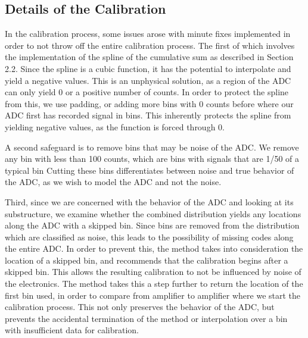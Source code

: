 \documentclass[11pt, letterpaper]{article}
\begin{document}
\subsection{Details of the Calibration} 
\indent 


In the calibration process, some issues arose with minute fixes implemented in order to not throw off the entire calibration process. 
The first of which involves the implementation of the spline of the cumulative sum as described in Section 2.2. 
Since the spline is a cubic function, it has the potential to interpolate and yield a negative values. 
This is an unphysical solution, as a region of the ADC can only yield 0 or a positive number of counts. 
In order to protect the spline from this, we use padding, or adding more bins with 0 counts before where our ADC first has recorded signal in bins. 
This inherently protects the spline from yielding negative values, as the function is forced through 0. 
\indent 


A second safeguard is to remove bins that may be noise of the ADC. 
We remove any bin with less than 100 counts, which are bins with signals that are 1/50 of a typical bin
Cutting these bins differentiates between noise and true behavior of the ADC, as we wish to model the ADC and not the noise. 
\indent


Third, since we are concerned with the behavior of the ADC and looking at its substructure, we examine whether the combined distribution yields any locations along the ADC with a skipped bin. 
Since bins are removed from the distribution which are classified as noise, this leads to the possibility of missing codes along the entire ADC. 
In order to prevent this, the method takes into consideration the location of a skipped bin, and recommends that the calibration begins after a skipped bin. 
This allows the resulting calibration to not be influenced by noise of the electronics. 
The method takes this a step further to return the location of the first bin used, in order to compare from amplifier to amplifier where we start the calibration process. 
This not only preserves the behavior of the ADC, but prevents the accidental termination of the method or interpolation over a bin with insufficient data for calibration. 
\indent 
\end{document}
